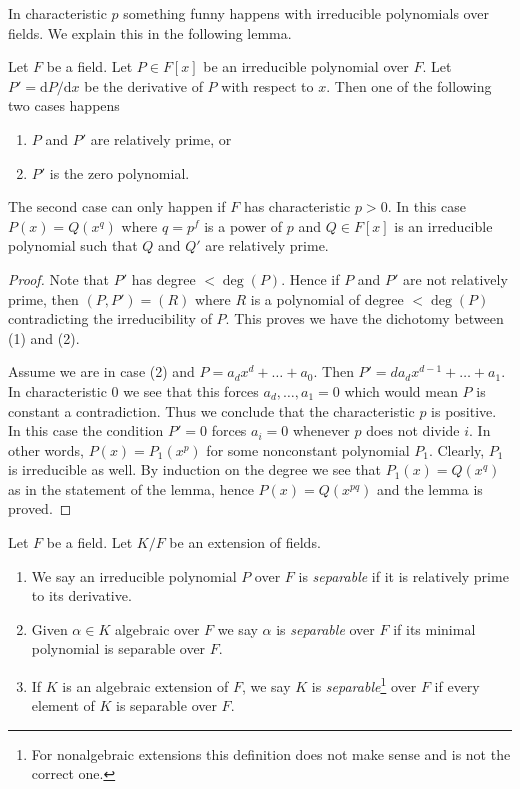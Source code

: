 \noindent
In characteristic $p$ something funny happens with irreducible polynomials
over fields. We explain this in the following lemma.

\begin{lemma}
\label{lemma-irreducible-polynomials}
Let $F$ be a field. Let $P \in F[x]$ be an irreducible polynomial over $F$.
Let $P' = \text{d}P/\text{d}x$ be the derivative of $P$ with respect
to $x$. Then one of the following two cases happens
\begin{enumerate}
\item $P$ and $P'$ are relatively prime, or
\item $P'$ is the zero polynomial.
\end{enumerate}
The second case can only happen if $F$ has characteristic $p > 0$.
In this case $P(x) = Q(x^q)$ where $q = p^f$ is a power of $p$ and
$Q \in F[x]$ is an irreducible polynomial such that $Q$ and $Q'$
are relatively prime.
\end{lemma}

\begin{proof}
Note that $P'$ has degree $< \deg(P)$. Hence if $P$ and $P'$ are not relatively
prime, then $(P, P') = (R)$ where $R$ is a polynomial of degree $< \deg(P)$
contradicting the irreducibility of $P$. This proves we have the dichotomy
between (1) and (2).

\medskip\noindent
Assume we are in case (2) and $P = a_d x^d + \ldots + a_0$. Then
$P' = da_d x^{d - 1} + \ldots + a_1$. In characteristic $0$ we see
that this forces $a_d, \ldots, a_1 = 0$ which would mean $P$ is constant
a contradiction. Thus we conclude that the characteristic $p$ is positive.
In this case the condition $P' = 0$ forces $a_i = 0$ whenever $p$ does
not divide $i$.
In other words, $P(x) = P_1(x^p)$ for some nonconstant polynomial $P_1$.
Clearly, $P_1$ is irreducible as well. By induction on the degree we
see that $P_1(x) = Q(x^q)$ as in the statement of the lemma, hence
$P(x) = Q(x^{pq})$ and the lemma is proved.
\end{proof}

\begin{definition}
\label{definition-separable}
Let $F$ be a field. Let $K/F$ be an extension of fields.
\begin{enumerate}
\item We say an irreducible polynomial $P$ over $F$ is {\it separable}
if it is relatively prime to its derivative.
\item Given $\alpha \in K$ algebraic over $F$ we say $\alpha$ is
{\it separable} over $F$ if its minimal polynomial is separable over $F$.
\item If $K$ is an algebraic extension of $F$, we say $K$ is
{\it separable}\footnote{For nonalgebraic extensions
this definition does not make sense and is not the correct one.}
over $F$ if every element of $K$ is separable over $F$.
\end{enumerate}
\end{definition}

